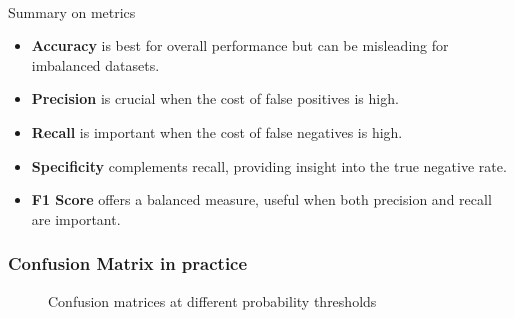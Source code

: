 \documentclass[
  a4paper,
]{scrbook}
\makeatletter
\let\oldparagraph\paragraph
\renewcommand{\paragraph}{
    \@ifstar
      \xxxParagraphStar
      \xxxParagraphNoStar
  }
\newcommand{\xxxParagraphStar}[1]{\oldparagraph*{#1}\mbox{}}
\newcommand{\xxxParagraphNoStar}[1]{\oldparagraph{#1}\mbox{}}
\providecommand{\tightlist}{%
  \setlength{\itemsep}{0pt}\setlength{\parskip}{0pt}}\usepackage{longtable,booktabs,array}
\makeatother
\begin{document}
\paragraph{Summary on metrics}\label{summary-on-metrics}

\begin{itemize}
\tightlist
\item
  \textbf{Accuracy} is best for overall performance but can be
  misleading for imbalanced datasets.
\item
  \textbf{Precision} is crucial when the cost of false positives is
  high.
\item
  \textbf{Recall} is important when the cost of false negatives is high.
\item
  \textbf{Specificity} complements recall, providing insight into the
  true negative rate.
\item
  \textbf{F1 Score} offers a balanced measure, useful when both
  precision and recall are important.
\end{itemize}

\subsubsection{Confusion Matrix in
practice}\label{confusion-matrix-in-practice}

\begin{figure}[H]


\caption{\label{fig-glm-conmat05}Confusion matrices at different
probability thresholds}

\end{figure}%
\end{document}

